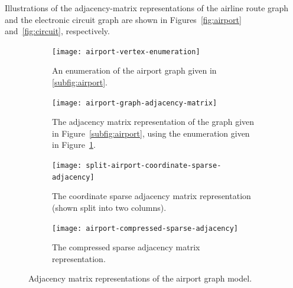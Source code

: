 Illustrations of the adjacency-matrix representations of the airline route graph and the electronic circuit graph are shown in Figures~\ref{fig:airport} and~\ref{fig:circuit}, respectively.

\begin{figure}[tbh]
  \begin{subfigure}[t]{0.175\textwidth}
    \centering
    \texttt{[image: airport-vertex-enumeration]}
    \caption{\label{fig:airport-vertex-enumeration}
    An enumeration of the airport graph given in \protect\ref{subfig:airport}.}
  \end{subfigure}
  \hspace{1em}
  \begin{subfigure}[t]{0.25\textwidth}
    \centering
    \texttt{[image: airport-graph-adjacency-matrix]}
    \caption{\label{fig:airport-graph-adjacency-matrix}
    The adjacency matrix representation of the graph given in Figure~\protect\ref{subfig:airport},
    using the enumeration given in Figure~\protect\ref{fig:airport-vertex-enumeration}.}
  \end{subfigure}
  \hspace{1em}
  \begin{subfigure}[t]{0.175\textwidth}
    \small
    \centering
    \texttt{[image: split-airport-coordinate-sparse-adjacency]}
    \caption{\label{fig:airport-coordinate-sparse-adjacency}
    The coordinate sparse adjacency matrix representation (shown split into two columns).}
  \end{subfigure}
  \hspace{1em}
  \begin{subfigure}[t]{0.3\textwidth}
    \small
    \centering
    \texttt{[image: airport-compressed-sparse-adjacency]}
    \caption{\label{fig:airport-compressed-sparse-adjacency}
    The compressed sparse adjacency matrix representation.}
  \end{subfigure}
  \caption{Adjacency matrix representations of the airport graph model.\label{fig:airport-representation}}
\end{figure}



